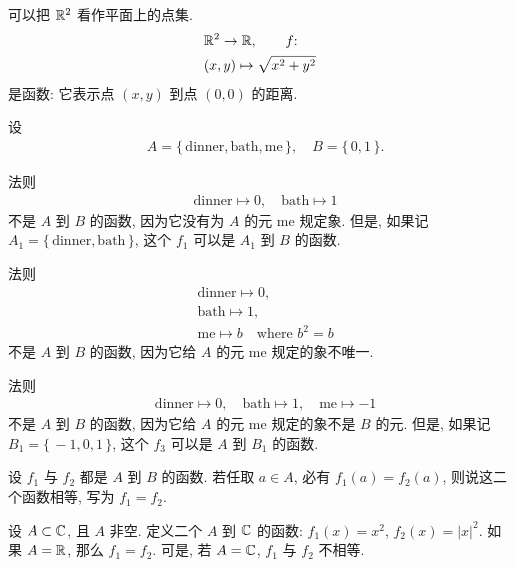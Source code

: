 \begin{example}
    可以把 $\mathbb{R}^2$ 看作平面上的点集.
    \begin{align*}
         & \mathbb{R}^2 \to \mathbb{R},  \tag*{$f$:}  \\
         & (x,y) \mapsto \sqrt{x^2+y^2}
    \end{align*}
    是函数: 它表示点 $(x,y)$ 到点 $(0,0)$ 的距离.
\end{example}

\begin{example}
    设
    \begin{align*}
         & A = \{\, \text{dinner}, \text{bath}, \text{me} \,\}, \quad B = \{\, 0,1 \,\}.
    \end{align*}

    法则
    \begin{align*}
         & \text{dinner} \mapsto 0, \quad \text{bath} \mapsto 1 \tag*{$f_1$:}
    \end{align*}
    不是 $A$ 到 $B$ 的函数, 因为它没有为 $A$ 的元 $\text{me}$ 规定象. 但是, 如果记 $A_1 = \{\, \text{dinner}, \text{bath} \,\}$, 这个 $f_1$ 可以是 $A_1$ 到 $B$ 的函数.

    法则
    \begin{align*}
         & \text{dinner} \mapsto 0, \tag*{$f_2$:}          \\
         & \text{bath} \mapsto 1,                          \\
         & \text{me} \mapsto b \quad \text{where } b^2 = b
    \end{align*}
    不是 $A$ 到 $B$ 的函数, 因为它给 $A$ 的元 $\text{me}$ 规定的象不唯一.

    法则
    \begin{align*}
         & \text{dinner} \mapsto 0, \quad
        \text{bath} \mapsto 1, \quad
        \text{me} \mapsto -1 \tag*{$f_3$:}
    \end{align*}
    不是 $A$ 到 $B$ 的函数, 因为它给 $A$ 的元 $\text{me}$ 规定的象不是 $B$ 的元. 但是, 如果记 $B_1 = \{\, -1,0,1 \,\}$, 这个 $f_3$ 可以是 $A$ 到 $B_1$ 的函数.
\end{example}

\begin{definition}
    设 $f_1$ 与 $f_2$ 都是 $A$ 到 $B$ 的函数. 若任取 $a \in A$, 必有 $f_1 (a) = f_2 (a)$, 则说这二个函数相等, 写为 $f_1 = f_2$.
\end{definition}

\begin{example}
    设 $A \subset \mathbb{C}$, 且 $A$ 非空. 定义二个 $A$ 到 $\mathbb{C}$ 的函数: $f_1 (x) = x^2$, $f_2 (x) = |x|^2$. 如果 $A = \mathbb{R}$, 那么 $f_1 = f_2$. 可是, 若 $A = \mathbb{C}$, $f_1$ 与 $f_2$ 不相等.
\end{example}

